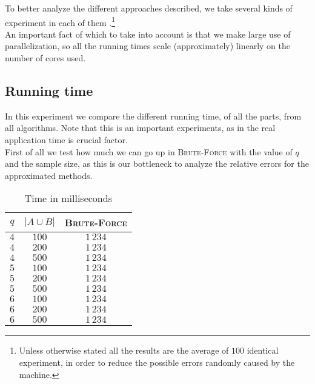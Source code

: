     To better analyze the different approaches described, we take several kinds of experiment in each of them .\footnote{Unless otherwise stated all the results are the average of $100$ identical experiment, in order to reduce the possible errors randomly caused by the machine.}\\
     
    An important fact of which to take into account is that we make large use of parallelization, 
    so all the running times scale (approximately) linearly on the number of cores used.
    
	\subsection*{Running time}
	
	In this experiment we compare the different running time, of all the parts, from all algorithms. Note that this is an important experiments, as in the real application time is crucial factor.\\

	First of all we test how much we can go up in \textsc{Brute-Force} with the value of $q$ and the sample size, as this is our bottleneck to analyze the relative errors for the approximated methods.\\ 
	
	\begin{table}[h]
		\centering
		\label{my-label}
		\begin{tabular}{|c|c|c|}
			\hline
			$q$ & $|A \cup B|$ & \textsc{Brute-Force} \\ \hline
			$4$ & $100$        & $1\,234$ \\ \hline
			$4$ & $200$        & $1\,234$ \\ \hline
			$4$ & $500$        & $1\,234$ \\ \hline
			$5$ & $100$        & $1\,234$ \\ \hline
			$5$ & $200$        & $1\,234$ \\ \hline
			$5$ & $500$        & $1\,234$ \\ \hline
			$6$ & $100$        & $1\,234$ \\ \hline
			$6$ & $200$        & $1\,234$ \\ \hline
			$6$ & $500$        & $1\,234$ \\ \hline
		\end{tabular}
		\caption{Time in milliseconds}
	\end{table}
	
	\clearpage
	
